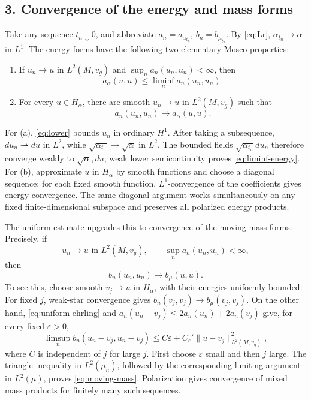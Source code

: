 \documentclass[11pt]{article}
\newcommand{\Ltwo}{L^2(M,v_g)}
\begin{document}
\subsection*{3. Convergence of the energy and mass forms}

Take any sequence \(t_n\downarrow0\), and abbreviate
\(a_n=a_{\alpha_{t_n}}\), \(b_n=b_{\mu_{t_n}}\).  By
\eqref{eq:Lr}, \(\alpha_{t_n}\to\alpha\) in \(L^1\).  The energy forms have
the following two elementary Mosco properties:
\begin{enumerate}[label=(\alph*)]
\item If \(u_n\to u\) in \(\Ltwo\) and
      \(\sup_n a_n(u_n,u_n)<\infty\), then
\begin{equation}\label{eq:liminf-energy}
 a_\alpha(u,u)\leq\liminf_n a_n(u_n,u_n).
\end{equation}
\item For every \(u\in H_\alpha\), there are smooth \(u_n\to u\) in
      \(\Ltwo\) such that
\begin{equation}\label{eq:recovery-energy}
 a_n(u_n,u_n)\longrightarrow a_\alpha(u,u).
\end{equation}
\end{enumerate}
For (a), \eqref{eq:lower} bounds \(u_n\) in ordinary \(H^1\).  After taking
a subsequence, \(du_n\rightharpoonup du\) in \(L^2\), while
\(\sqrt{\alpha_{t_n}}\to\sqrt\alpha\) in \(L^2\).  The bounded fields
\(\sqrt{\alpha_{t_n}}du_n\) therefore converge weakly to
\(\sqrt\alpha,du\); weak lower semicontinuity proves
\eqref{eq:liminf-energy}.  For (b), approximate \(u\) in \(H_\alpha\) by
smooth functions and choose a diagonal sequence; for each fixed smooth
function, \(L^1\)-convergence of the coefficients gives energy convergence.
The same diagonal argument works simultaneously on any fixed
finite-dimensional subspace and preserves all polarized energy products.

The uniform estimate upgrades this to convergence of the moving mass forms.
Precisely, if
\begin{equation}\label{eq:moving-assumption}
 u_n\to u\text{ in }\Ltwo,\qquad \sup_n a_n(u_n,u_n)<\infty,
\end{equation}
then
\begin{equation}\label{eq:moving-mass}
 b_n(u_n,u_n)\longrightarrow b_\mu(u,u).
\end{equation}
To see this, choose smooth \(v_j\to u\) in \(H_\alpha\), with their energies
uniformly bounded.  For fixed \(j\), weak-star convergence gives
\(b_n(v_j,v_j)\to b_\mu(v_j,v_j)\).  On the other hand,
\eqref{eq:uniform-ehrling} and
\(a_n(u_n-v_j)\leq2a_n(u_n)+2a_n(v_j)\) give, for every fixed
\(\varepsilon>0\),
\[
 \limsup_n b_n(u_n-v_j,u_n-v_j)
 \leq C\varepsilon+C_\varepsilon'\|u-v_j\|_{\Ltwo}^2,
\]
where \(C\) is independent of \(j\) for large \(j\).  First choose
\(\varepsilon\) small and then \(j\) large.  The triangle inequality in
\(L^2(\mu_n)\), followed by the corresponding limiting argument in
\(L^2(\mu)\), proves \eqref{eq:moving-mass}.  Polarization gives convergence
of mixed mass products for finitely many such sequences.
\end{document}
